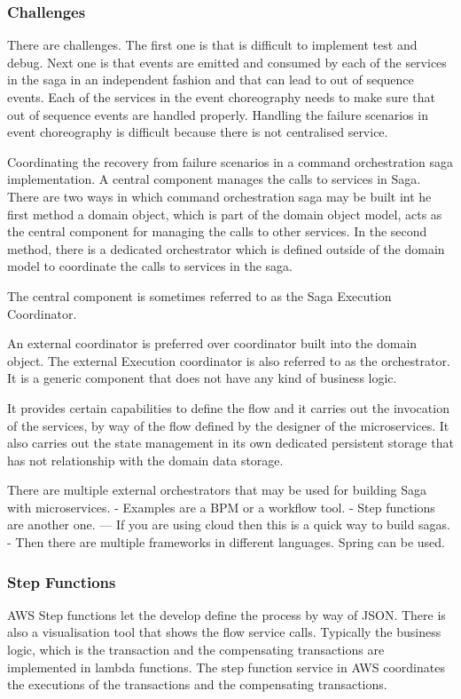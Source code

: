 \documentclass[a4paper, 11pt]{book}
\begin{document}
    \subsubsection{Challenges}
    There are challenges.
    The first one is that is difficult to implement test and debug.
    Next one is that events are emitted and consumed by each of the services in the saga in an independent fashion and that can lead to out of sequence events.
    Each of the services in the event choreography needs to make sure that out of sequence events are handled properly.
    Handling the failure scenarios in event choreography is difficult because there is not centralised service.

    Coordinating the recovery from failure scenarios in a command orchestration saga implementation.
    A central component manages the calls to services in Saga.
    There are two ways in which command orchestration saga may be built int he first method a domain object,
    which is part of the domain object model, acts as the central component for managing the calls to other services.
    In the second method, there is a dedicated orchestrator which is defined outside of the domain model to coordinate the calls to services in the saga.

    The central component is sometimes referred to as the Saga Execution Coordinator.

    An external coordinator is preferred over coordinator built into the domain object.
    The external Execution coordinator is also referred to as the orchestrator.
    It is a generic component that does not have any kind of business logic.

    It provides certain capabilities to define the flow and it carries out the invocation of the services, by way of the flow defined by the designer of the microservices.
    It also carries out the state management in its own dedicated persistent storage that has not relationship with the domain data storage.

    There are multiple external orchestrators that may be used for building Saga with microservices.
    - Examples are a BPM or a workflow tool.
    - Step functions are another one.
    --- If you are using cloud then this is a quick way to build sagas.
    - Then there are multiple frameworks in different languages. Spring can be used.

    \subsubsection{Step Functions}
    AWS Step functions let the develop define the process by way of JSON.
    There is also a visualisation tool that shows the flow service calls.
    Typically the business logic, which is the transaction and the compensating transactions are implemented in lambda functions.
    The step function service in AWS coordinates the executions of the transactions and the compensating transactions.
\end{document}
